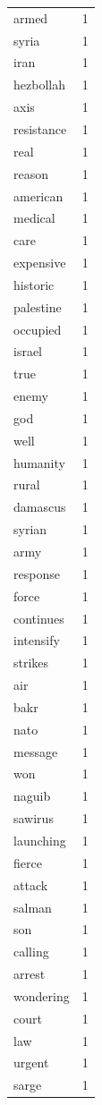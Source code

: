 \begin{tabular}{lr}
armed & 1 \\
syria & 1 \\
iran & 1 \\
hezbollah & 1 \\
axis & 1 \\
resistance & 1 \\
real & 1 \\
reason & 1 \\
american & 1 \\
medical & 1 \\
care & 1 \\
expensive & 1 \\
historic & 1 \\
palestine & 1 \\
occupied & 1 \\
israel & 1 \\
true & 1 \\
enemy & 1 \\
god & 1 \\
well & 1 \\
humanity & 1 \\
rural & 1 \\
damascus & 1 \\
syrian & 1 \\
army & 1 \\
response & 1 \\
force & 1 \\
continues & 1 \\
intensify & 1 \\
strikes & 1 \\
air & 1 \\
bakr & 1 \\
nato & 1 \\
message & 1 \\
won & 1 \\
naguib & 1 \\
sawirus & 1 \\
launching & 1 \\
fierce & 1 \\
attack & 1 \\
salman & 1 \\
son & 1 \\
calling & 1 \\
arrest & 1 \\
wondering & 1 \\
court & 1 \\
law & 1 \\
urgent & 1 \\
sarge & 1 \\

\end{tabular}
